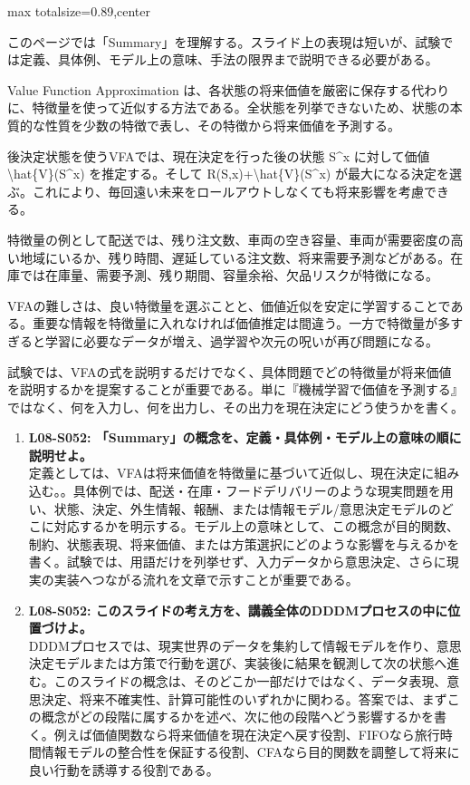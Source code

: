 \begin{minipage}[t]{0.58\textwidth}
\begin{adjustbox}{max totalsize={\textwidth}{0.89\textheight},center}
\begin{minipage}{\textwidth}\scriptsize
{}このページでは「Summary」を理解する。スライド上の表現は短いが、試験では定義、具体例、モデル上の意味、手法の限界まで説明できる必要がある。\par
Value Function Approximation は、各状態の将来価値を厳密に保存する代わりに、特徴量を使って近似する方法である。全状態を列挙できないため、状態の本質的な性質を少数の特徴で表し、その特徴から将来価値を予測する。\par
後決定状態を使うVFAでは、現在決定を行った後の状態 S\textasciicircum{}x に対して価値 \textbackslash{}hat\{V\}(S\textasciicircum{}x) を推定する。そして R(S,x)+\textbackslash{}hat\{V\}(S\textasciicircum{}x) が最大になる決定を選ぶ。これにより、毎回遠い未来をロールアウトしなくても将来影響を考慮できる。\par
特徴量の例として配送では、残り注文数、車両の空き容量、車両が需要密度の高い地域にいるか、残り時間、遅延している注文数、将来需要予測などがある。在庫では在庫量、需要予測、残り期間、容量余裕、欠品リスクが特徴になる。\par
VFAの難しさは、良い特徴量を選ぶことと、価値近似を安定に学習することである。重要な情報を特徴量に入れなければ価値推定は間違う。一方で特徴量が多すぎると学習に必要なデータが増え、過学習や次元の呪いが再び問題になる。\par
試験では、VFAの式を説明するだけでなく、具体問題でどの特徴量が将来価値を説明するかを提案することが重要である。単に『機械学習で価値を予測する』ではなく、何を入力し、何を出力し、その出力を現在決定にどう使うかを書く。\par{}\begin{enumerate}\item \textbf{L08-S052: 「Summary」の概念を、定義・具体例・モデル上の意味の順に説明せよ。}\\定義としては、VFAは将来価値を特徴量に基づいて近似し、現在決定に組み込む。。具体例では、配送・在庫・フードデリバリーのような現実問題を用い、状態、決定、外生情報、報酬、または情報モデル/意思決定モデルのどこに対応するかを明示する。モデル上の意味として、この概念が目的関数、制約、状態表現、将来価値、または方策選択にどのような影響を与えるかを書く。試験では、用語だけを列挙せず、入力データから意思決定、さらに現実の実装へつながる流れを文章で示すことが重要である。\item \textbf{L08-S052: このスライドの考え方を、講義全体のDDDMプロセスの中に位置づけよ。}\\DDDMプロセスでは、現実世界のデータを集約して情報モデルを作り、意思決定モデルまたは方策で行動を選び、実装後に結果を観測して次の状態へ進む。このスライドの概念は、そのどこか一部だけではなく、データ表現、意思決定、将来不確実性、計算可能性のいずれかに関わる。答案では、まずこの概念がどの段階に属するかを述べ、次に他の段階へどう影響するかを書く。例えば価値関数なら将来価値を現在決定へ戻す役割、FIFOなら旅行時間情報モデルの整合性を保証する役割、CFAなら目的関数を調整して将来に良い行動を誘導する役割である。\end{enumerate}

\end{minipage}
\end{adjustbox}
\end{minipage}
